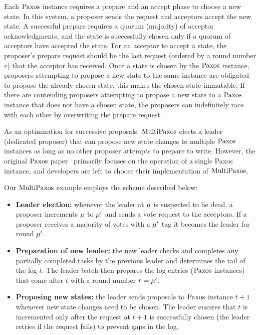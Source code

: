 Each $\mathrm{Paxos}$ instance requires a prepare and an accept phase to choose a new state. 
In this system, a proposer sends the request and acceptors accept the new state. 
A successful prepare requires a quorum (majority) of acceptor acknowledgments, and the state is successfully chosen only if a quorum of acceptors have accepted the state. 
For an acceptor to accept a state, the proposer's prepare
request should be the last request (ordered by a round number $r$)
that the acceptor has received.
Once a state is chosen by the $\mathrm{Paxos}$ instance, 
proposers attempting to propose a new state to the same instance are obligated to propose the already-chosen state; 
this makes the chosen state immutable. 
If there are contending proposers attempting to propose a new state to a $\mathrm{Paxos}$ instance that does not have a chosen state, 
the proposers can indefinitely race with each other by overwriting the prepare request.

As an optimization for successive proposals, $\mathrm{MultiPaxos}$ elects a leader (dedicated proposer) that can propose new state changes to multiple $\mathrm{Paxos}$ instances as long as no other proposer attempts to prepare to write. However, the original $\mathrm{Paxos}$ paper~\cite{paxos, paxosmadesimple} 
primarily focuses on the operation of a single Paxos instance, and developers are left to choose their implementation of $\mathrm{MultiPaxos}$.


Our $\mathrm{MultiPaxos}$ example employs the scheme described below:
\begin{itemize}
	\item {\textbf{Leader election: }} whenever the leader at $\mu$ is
		suspected to be dead, a proposer increments $\mu$ to $\mu'$ and
		sends a vote request to the acceptors.
		If a proposer receives a majority of votes with a $\mu'$ tag it
		becomes the leader for round $\mu'$.
	\item {\textbf{Preparation of new leader: }}  the new leader checks and completes any partially completed tasks by the previous leader and determines the tail of the log  $t$. 
The leader batch then prepares the log entries ($\mathrm{Paxos}$ instances) that come after $t$ with a round number  $r = \mu'$.
	\item {\textbf{Proposing new states: }} the leader sends proposals
		to $\mathrm{Paxos}$ instance $t+1$ whenever new state changes need to be chosen.
		The leader ensures   that $t$ is incremented only after the
		request at $t+1$ is successfully chosen (the leader retries if the request fails) to prevent gaps  in the log.
\end{itemize}


